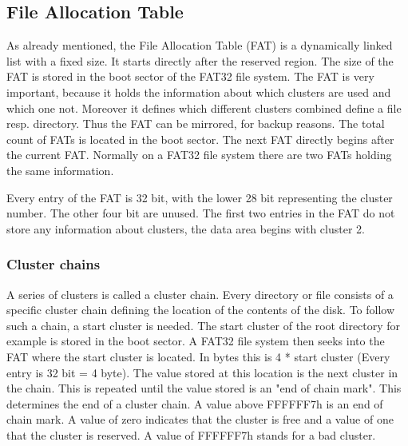 \subsection{File Allocation Table}

As already mentioned, the File Allocation Table (FAT) is a dynamically linked list with a fixed size. It starts directly after the reserved region. The size of the FAT is stored in the boot sector of the FAT32 file system. The FAT is very important, because it holds the information about which clusters are used and which one not. Moreover it defines which different clusters combined define a file resp. directory. Thus the FAT can be mirrored, for backup reasons. The total count of FATs is located in the boot sector. The next FAT directly begins after the current FAT. Normally on a FAT32 file system there are two FATs holding the same information.

Every entry of the FAT is 32 bit, with the lower 28 bit representing the cluster number. The other four bit are unused. The first two entries in the FAT do not store any information about clusters, the data area begins with cluster 2.

\subsubsection{Cluster chains}

A series of clusters is called a cluster chain. Every directory or file consists of a specific cluster chain defining the location of the contents of the disk. To follow such a chain, a start cluster is needed. The start cluster of the root directory for example is stored in the boot sector. A FAT32 file system then seeks into the FAT where the start cluster is located. In bytes this is 4 * start cluster (Every entry is 32 bit = 4 byte). The value stored at this location is the next cluster in the chain. This is repeated until the value stored is an "end of chain mark". This determines the end of a cluster chain. A value above FFFFFF7h is an end of chain mark. A value of zero indicates that the cluster is free and a value of one that the cluster is reserved. A value of FFFFFF7h stands for a bad cluster.

